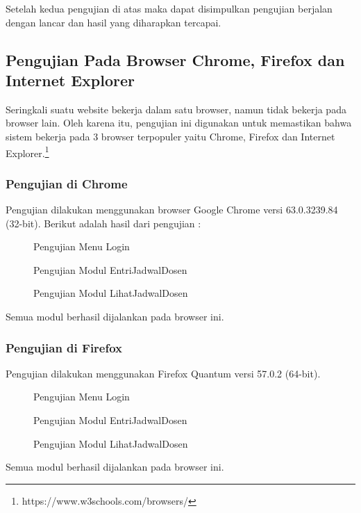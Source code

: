 Setelah kedua pengujian di atas maka dapat disimpulkan pengujian berjalan dengan lancar dan hasil yang diharapkan tercapai.

\subsection{Pengujian Pada Browser Chrome, Firefox dan Internet Explorer}
Seringkali suatu website bekerja dalam satu browser, namun tidak bekerja pada browser lain. Oleh karena itu, pengujian ini digunakan untuk memastikan bahwa sistem bekerja pada 3 browser terpopuler yaitu Chrome, Firefox dan Internet Explorer.\footnote{https://www.w3schools.com/browsers/}
\subsubsection{Pengujian di Chrome}
Pengujian dilakukan menggunakan browser Google Chrome versi 63.0.3239.84 (32-bit). Berikut adalah hasil dari pengujian :
\begin{figure} [H]
	\centering  
	\caption[Pengujian Menu Login]{Pengujian Menu Login} 
	\end{figure}
\begin{figure} [H]
	\centering  
	\caption[Pengujian Modul EntriJadwalDosen]{Pengujian Modul EntriJadwalDosen} 
	\end{figure}
\begin{figure} [H]
	\centering  
	\caption[Pengujian Modul LihatJadwalDosen]{Pengujian Modul LihatJadwalDosen} 
	\end{figure}
Semua modul berhasil dijalankan pada browser ini.
\subsubsection{Pengujian di Firefox}
Pengujian dilakukan menggunakan Firefox Quantum versi 57.0.2 (64-bit).
\begin{figure} [H]
	\centering  
	\caption[Pengujian Menu Login]{Pengujian Menu Login} 
	\end{figure}
\begin{figure} [H]
	\centering  
	\caption[Pengujian Modul EntriJadwalDosen]{Pengujian Modul EntriJadwalDosen} 
	\end{figure}
\begin{figure} [H]
	\centering  
	\caption[Pengujian Modul LihatJadwalDosen]{Pengujian Modul LihatJadwalDosen} 
	\end{figure}
Semua modul berhasil dijalankan pada browser ini.

